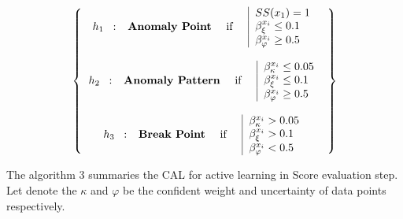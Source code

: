 \begin{equation}\label{hypothesis}
\left \{\begin{tabular}{c}
$ h_1 $ \, : \, \textbf{Anomaly Point} \quad \textrm{if} \quad $ \begin{tabular}{|l}
$ SS(x_1) = 1  $ \\
$ \beta^{x_i}_{\xi} \leq 0.1  $ \\
$ \beta^{x_i}_{\varphi} \geq 0.5  $ 
\end{tabular} $\\\\
$ h_2 $ \, : \, \textbf{Anomaly Pattern} \quad \textrm{if} \quad $ \begin{tabular}{|l}
$ \beta^{x_i}_{\kappa} \leq 0.05  $ \\
$ \beta^{x_i}_{\xi} \leq 0.1  $ \\
$ \beta^{x_i}_{\varphi} \geq 0.5  $ 
\end{tabular} $\\\\
$ h_3 $ \, : \, \textbf{Break Point} \quad \textrm{if} \quad $ \begin{tabular}{|l}
$ \beta^{x_i}_{\kappa} > 0.05  $ \\
$ \beta^{x_i}_{\xi} > 0.1  $ \\
$ \beta^{x_i}_{\varphi} < 0.5  $ 
\end{tabular} $\\
\end{tabular}
\right \}
\end{equation}


The algorithm 3 summaries the CAL for active learning in Score evaluation step. Let denote the $ \kappa $ and $ \varphi $ be the confident weight and uncertainty of data points respectively.

